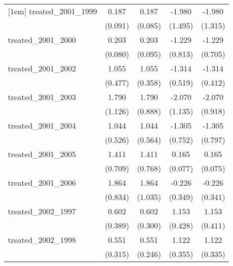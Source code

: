 {\begin{tabular}{l*{4}{c}}
[1em]
treated\_2001\_1999&       0.187\sym{*}  &       0.187\sym{*}  &      -1.980         &      -1.980         \\
            &     (0.091)         &     (0.085)         &     (1.495)         &     (1.315)         \\
[1em]
treated\_2001\_2000&       0.203\sym{*}  &       0.203\sym{*}  &      -1.229         &      -1.229         \\
            &     (0.080)         &     (0.095)         &     (0.813)         &     (0.705)         \\
[1em]
treated\_2001\_2002&       1.055\sym{*}  &       1.055\sym{**} &      -1.314\sym{*}  &      -1.314\sym{**} \\
            &     (0.477)         &     (0.358)         &     (0.519)         &     (0.412)         \\
[1em]
treated\_2001\_2003&       1.790         &       1.790\sym{*}  &      -2.070         &      -2.070\sym{*}  \\
            &     (1.126)         &     (0.888)         &     (1.135)         &     (0.918)         \\
[1em]
treated\_2001\_2004&       1.044\sym{*}  &       1.044         &      -1.305         &      -1.305         \\
            &     (0.526)         &     (0.564)         &     (0.752)         &     (0.797)         \\
[1em]
treated\_2001\_2005&       1.411\sym{*}  &       1.411         &       0.165\sym{*}  &       0.165\sym{*}  \\
            &     (0.709)         &     (0.768)         &     (0.077)         &     (0.075)         \\
[1em]
treated\_2001\_2006&       1.864\sym{*}  &       1.864         &      -0.226         &      -0.226         \\
            &     (0.834)         &     (1.035)         &     (0.349)         &     (0.341)         \\
[1em]
treated\_2002\_1997&       0.602         &       0.602\sym{*}  &       1.153\sym{**} &       1.153\sym{**} \\
            &     (0.389)         &     (0.300)         &     (0.428)         &     (0.411)         \\
[1em]
treated\_2002\_1998&       0.551         &       0.551\sym{*}  &       1.122\sym{**} &       1.122\sym{***}\\
            &     (0.315)         &     (0.246)         &     (0.355)         &     (0.335)         \\

\end{tabular}}
